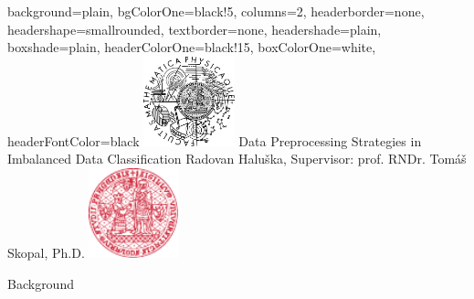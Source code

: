\documentclass[a0paper, portrait, fontscale=0.255]{baposter}
\begin{document}
\color{black!80}

\begin{poster}{
    background=plain,
    bgColorOne=black!5,
    columns=2,
    headerborder=none,
    headershape=smallrounded,
    textborder=none,
    headershade=plain,
    boxshade=plain,
    headerColorOne=black!15,
    boxColorOne=white,
    headerFontColor=black
}
{\includegraphics[height=7em]{logos/mff-black.pdf}}
{Data Preprocessing Strategies in Imbalanced Data Classification}
{\vspace{1ex} Radovan Haluška, Supervisor: prof. RNDr. Tomáš Skopal, Ph.D.}
{\includegraphics[height=7em]{logos/uk-red.pdf}}


\begin{posterbox}[column=0, name=background]{Background}


\end{posterbox}
\end{poster}
\end{document}
